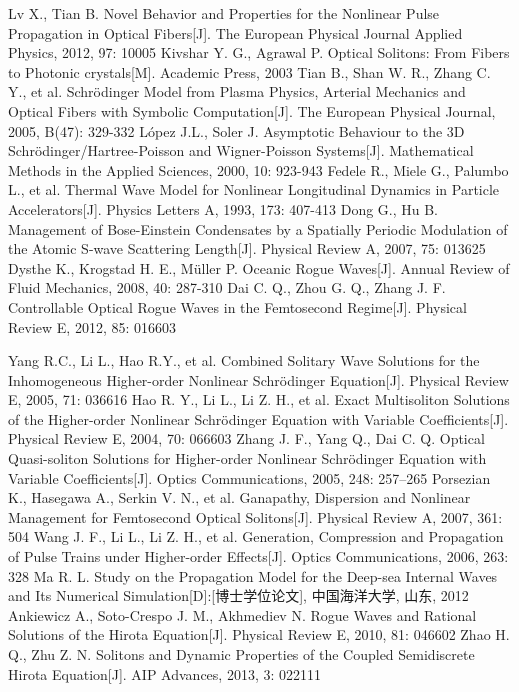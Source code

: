 \begin{thebibliography}{0}
 Lv X., Tian B. Novel Behavior and Properties for the Nonlinear Pulse Propagation in Optical Fibers[J]. The  European  Physical  Journal  Applied  Physics, 2012, 97: 10005
 Kivshar Y. G., Agrawal P. Optical Solitons: From Fibers to Photonic crystals[M]. Academic Press, 2003
 Tian B., Shan W. R., Zhang C. Y., et al. Schr\"{o}dinger Model from Plasma Physics, Arterial Mechanics and Optical Fibers with Symbolic Computation[J]. The European Physical Journal, 2005, B(47): 329-332
 L\'{o}pez J.L., Soler J. Asymptotic Behaviour to the 3D Schr\"{o}dinger/Hartree-Poisson and Wigner-Poisson Systems[J]. Mathematical Methods in the Applied Sciences, 2000, 10: 923-943
 Fedele R., Miele G., Palumbo L., et al. Thermal Wave Model for Nonlinear Longitudinal Dynamics in Particle Accelerators[J]. Physics Letters A, 1993, 173: 407-413
 Dong G., Hu B. Management of Bose-Einstein Condensates by a Spatially Periodic Modulation of the Atomic S-wave Scattering Length[J]. Physical Review A,  2007, 75: 013625
 Dysthe K., Krogstad H. E., M\"{u}ller P. Oceanic Rogue Waves[J]. Annual Review of Fluid Mechanics, 2008, 40: 287-310
 Dai C. Q., Zhou G. Q., Zhang J. F. Controllable Optical Rogue Waves in the Femtosecond Regime[J]. Physical Review E, 2012, 85: 016603


 Yang R.C., Li L., Hao R.Y., et al. Combined Solitary Wave Solutions for the Inhomogeneous Higher-order Nonlinear Schr\"{o}dinger Equation[J]. Physical Review E, 2005, 71: 036616
 Hao R. Y., Li L., Li Z. H., et al. Exact Multisoliton Solutions of the Higher-order Nonlinear Schr\"{o}dinger Equation with Variable Coefficients[J]. Physical Review E, 2004, 70: 066603
 Zhang J. F., Yang Q., Dai C. Q. Optical Quasi-soliton Solutions for Higher-order Nonlinear Schr\"{o}dinger Equation with Variable Coefficients[J]. Optics Communications, 2005, 248: 257–265
 Porsezian K., Hasegawa A., Serkin V. N., et al. Ganapathy, Dispersion and Nonlinear Management for Femtosecond Optical Solitons[J]. Physical Review A, 2007, 361: 504
 Wang J. F., Li L., Li Z. H., et al. Generation, Compression and Propagation of Pulse Trains under Higher-order Effects[J]. Optics Communications, 2006, 263: 328
 Ma R. L. Study on the Propagation Model for the Deep-sea Internal Waves and Its Numerical Simulation[D]:[博士学位论文], 中国海洋大学, 山东, 2012
 Ankiewicz A., Soto-Crespo J. M., Akhmediev N. Rogue Waves and Rational Solutions of the Hirota Equation[J]. Physical Review E, 2010, 81: 046602
 Zhao H. Q., Zhu Z. N. Solitons and Dynamic Properties of the Coupled Semidiscrete Hirota Equation[J]. AIP Advances, 2013, 3: 022111



\end{thebibliography}
